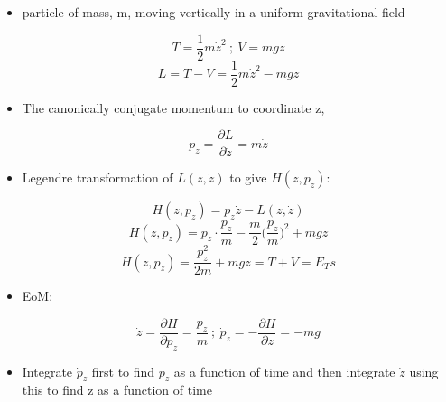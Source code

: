 \documentclass[a4paper,11pt,normalem]{article}
\begin{document}
\begin{example}[1]

\begin{itemize}
\item
  particle of mass, m, moving vertically in a uniform gravitational
  field
\end{itemize}

\[
    T = \frac{1}{2}m\dot{z}^2 ~;~ V = mgz \] \[
    L = T - V = \frac{1}{2}m\dot{z}^2 - mgz
\]

\begin{itemize}
\item
  The canonically conjugate momentum to coordinate z,
\end{itemize}

\[
    p_z = \frac{\partial L}{\partial \dot{z}} = m\dot{z}
\]

\begin{itemize}
\item
  Legendre transformation of \(L(z,\dot{z})\) to give \(H(z, p_z)\):
\end{itemize}

\[
    H(z, p_z) = p_z\dot{z} - L(z,\dot{z}) \] \[
    H(z, p_z) = p_z \cdot \frac{p_z}{m} - \frac{m}{2} \Big(\frac{p_z}{m}\Big)^2 + mgz \]
\[
    H(z, p_z) =  \frac{p_{z}^2}{2m} + mgz = T + V = E_T s
\]

\begin{itemize}
\item
  EoM:
\end{itemize}

\[
    \dot{z} = \frac{\partial H}{\partial p_z} = \frac{p_z}{m} ~;~ \dot{p}_z = -\frac{\partial H}{\partial z} = -mg
\]

\begin{itemize}
\item
  Integrate \(\dot{p}_z\) first to find \(p_z\) as a function of time
  and then integrate \(\dot{z}\) using this to find z as a function of
  time
\end{itemize}
\end{example}
\end{document}
